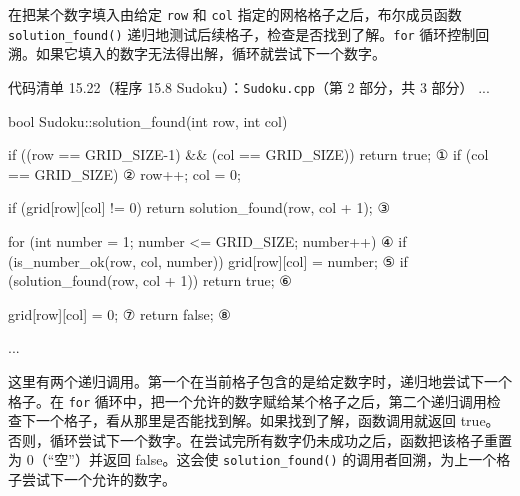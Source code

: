 在把某个数字填入由给定 \texttt{row} 和 \texttt{col} 指定的网格格子之后，布尔成员函数 \texttt{solution\_\allowbreak{}found(\allowbreak{})\allowbreak{}} 递归地测试后续格子，检查是否找到了解。\texttt{for} 循环控制回溯。如果它填入的数字无法得出解，循环就尝试下一个数字。

\begin{codeboxt}{代码清单 15.22（程序 15.8 Sudoku）：\texttt{Sudoku.\allowbreak{}cpp}（第 2 部分，共 3 部分）}
...

bool Sudoku::solution_found(int row, int col)
{
    if ((row == GRID_SIZE-1) && (col == GRID_SIZE)) return true;  ①
    if (col == GRID_SIZE)                                         ②
    {
        row++;
        col = 0;
    }

    if (grid[row][col] != 0) return solution_found(row, col + 1); ③

    for (int number = 1; number <= GRID_SIZE; number++)           ④
    {
        if (is_number_ok(row, col, number))
        {
            grid[row][col] = number;                              ⑤
            if (solution_found(row, col + 1)) return true;        ⑥
        }
    }

    grid[row][col] = 0;                                           ⑦
    return false;                                                 ⑧
}
...
\end{codeboxt}
\par
{}\par
{}\par
{}\par
{}\par
{}\par
{}\par
{}\par

这里有两个递归调用。第一个在当前格子包含的是给定数字时，递归地尝试下一个格子。在 \texttt{for} 循环中，把一个允许的数字赋给某个格子之后，第二个递归调用检查下一个格子，看从那里是否能找到解。如果找到了解，函数调用就返回 true。否则，循环尝试下一个数字。在尝试完所有数字仍未成功之后，函数把该格子重置为 0（“空”）并返回 false。这会使 \texttt{solution\_\allowbreak{}found(\allowbreak{})\allowbreak{}} 的调用者回溯，为上一个格子尝试下一个允许的数字。

